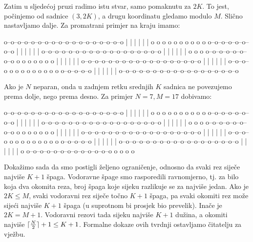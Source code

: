 Zatim u sljedećoj pruzi radimo istu stvar, samo pomaknutu za $2K$. To jest,
počinjemo od sadnice $(3, 2K)$, a drugu koordinatu gledamo modulo $M$. Slično
nastavljamo dalje. Za promatrani primjer na kraju imamo:

\begin{verbbox}
o--o--o--o--o--o--o--o--o--o--o--o--o--o--o--o--o--o
|  |  |  |  |                                      |
o  o  o  o  o  o  o  o  o  o  o--o--o--o--o--o--o--o
               |  |  |  |  |                       |
o--o--o--o--o--o--o--o--o--o--o--o--o--o--o--o--o--o
                              |  |  |  |  |        |
o  o  o  o--o--o--o--o--o--o--o  o  o  o  o  o  o  o
|  |  |                                      |  |  |
o--o--o--o--o--o--o--o--o--o--o--o--o--o--o--o--o--o
         |  |  |  |  |                             |
o--o--o--o  o  o  o  o  o  o  o  o  o  o--o--o--o--o
                        |  |  |  |  |              |
o--o--o--o--o--o--o--o--o--o--o--o--o--o--o--o--o--o
\end{verbbox}
\begin{figure}[H]
  \centering
  \theverbbox
\end{figure}

Ako je $N$ neparan, onda u zadnjem retku srednjih $K$ sadnica ne povezujemo
prema dolje, nego prema desno. Za primjer $N = 7, M = 17$ dobivamo:

\begin{verbbox}
o--o--o--o--o--o--o--o--o--o--o--o--o--o--o--o--o--o
|  |  |  |  |                                      |
o  o  o  o  o  o  o  o  o  o  o--o--o--o--o--o--o--o
               |  |  |  |  |                       |
o--o--o--o--o--o--o--o--o--o--o--o--o--o--o--o--o--o
                              |  |  |  |  |        |
o  o  o  o--o--o--o--o--o--o--o  o  o  o  o  o  o  o
|  |  |                                      |  |  |
o--o--o--o--o--o--o--o--o--o--o--o--o--o--o--o--o--o
         |  |  |  |  |                             |
o--o--o--o  o  o  o  o  o  o  o  o  o  o--o--o--o--o
                        |  |  |  |  |              |
o--o--o--o--o--o--o--o--o--o--o--o--o--o--o--o--o--o
|                                      |  |  |  |  |
o  o--o--o--o--o--o--o--o--o--o--o--o--o  o  o  o  o
\end{verbbox}
\begin{figure}[H]
  \centering
  \theverbbox
\end{figure}

Dokažimo sada da smo postigli željeno ograničenje, odnosno da svaki rez siječe
najviše $K + 1$ špaga. Vodoravne špage smo rasporedili ravnomjerno, tj. za bilo
koja dva okomita reza, broj špaga koje sijeku razlikuje se za najviše jedan.
Ako je $2K \leq M$, svaki vodoravni rez siječe točno $K + 1$ špaga, pa svaki
okomiti rez može sijeći najviše $K + 1$ špaga (u suprotnom bi prosjek bio
prevelik). Inače je $2K = M + 1$. Vodoravni rezovi tada sijeku najviše $K + 1$
dužina, a okomiti najviše $\lceil\frac{N}{2}\rceil + 1 \leq K + 1$. 
Formalne dokaze ovih tvrdnji ostavljamo čitatelju za vježbu.
